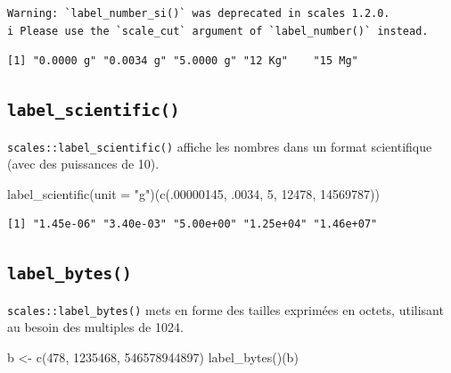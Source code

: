 \documentclass[
  letterpaper,
  DIV=11,
  numbers=noendperiod,
  oneside]{scrreprt}
\newenvironment{Shaded}{\begin{snugshade}}{\end{snugshade}}
\newcommand{\AttributeTok}[1]{\textcolor[rgb]{0.40,0.45,0.13}{#1}}
\newcommand{\DecValTok}[1]{\textcolor[rgb]{0.68,0.00,0.00}{#1}}
\newcommand{\FunctionTok}[1]{\textcolor[rgb]{0.28,0.35,0.67}{#1}}
\newcommand{\NormalTok}[1]{\textcolor[rgb]{0.00,0.23,0.31}{#1}}
\newcommand{\OtherTok}[1]{\textcolor[rgb]{0.00,0.23,0.31}{#1}}
\newcommand{\StringTok}[1]{\textcolor[rgb]{0.13,0.47,0.30}{#1}}
\begin{document}
\begin{verbatim}
Warning: `label_number_si()` was deprecated in scales 1.2.0.
i Please use the `scale_cut` argument of `label_number()` instead.
\end{verbatim}

\begin{verbatim}
[1] "0.0000 g" "0.0034 g" "5.0000 g" "12 Kg"    "15 Mg"   
\end{verbatim}

\hypertarget{label_scientific}{%
\subsection{\texorpdfstring{\texttt{label\_scientific()}}{label\_scientific()}}\label{label_scientific}}

\texttt{scales::label\_scientific()} affiche les nombres dans un format
scientifique (avec des puissances de 10).

\begin{Shaded}
\begin{Highlighting}[]
\FunctionTok{label\_scientific}\NormalTok{(}\AttributeTok{unit =} \StringTok{"g"}\NormalTok{)(}\FunctionTok{c}\NormalTok{(.}\DecValTok{00000145}\NormalTok{, .}\DecValTok{0034}\NormalTok{, }\DecValTok{5}\NormalTok{, }\DecValTok{12478}\NormalTok{, }\DecValTok{14569787}\NormalTok{))}
\end{Highlighting}
\end{Shaded}

\begin{verbatim}
[1] "1.45e-06" "3.40e-03" "5.00e+00" "1.25e+04" "1.46e+07"
\end{verbatim}

\hypertarget{label_bytes}{%
\subsection{\texorpdfstring{\texttt{label\_bytes()}}{label\_bytes()}}\label{label_bytes}}

\texttt{scales::label\_bytes()} mets en forme des tailles exprimées en
octets, utilisant au besoin des multiples de 1024.

\begin{Shaded}
\begin{Highlighting}[]
\NormalTok{b }\OtherTok{\textless{}{-}} \FunctionTok{c}\NormalTok{(}\DecValTok{478}\NormalTok{, }\DecValTok{1235468}\NormalTok{, }\DecValTok{546578944897}\NormalTok{)}
\FunctionTok{label\_bytes}\NormalTok{()(b)}
\end{Highlighting}
\end{Shaded}
\end{document}
